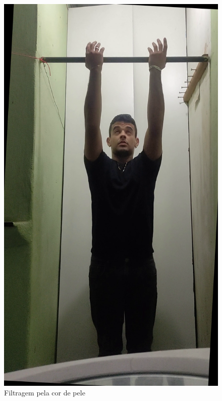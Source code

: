 \renewcommand{\sizeImg}{0.3}
\begin{figure}[H]
    \caption{Filtragem pela cor de pele}
    \centering
        \begin{minipage}{\sizeImg\textwidth}
            \includegraphics[width=\textwidth]{figuras/mao_barra/original.png}
        \end{minipage}
        \begin{minipage}{\sizeImg\textwidth}

\end{minipage}
\end{figure}
